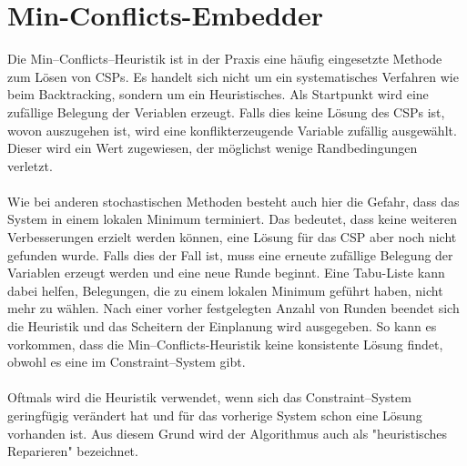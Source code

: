 \section{Min-Conflicts-Embedder}\label{minConflicts}
Die Min--Conflicts--Heuristik ist in der Praxis eine häufig eingesetzte Methode zum Lösen von CSPs. Es handelt sich nicht um ein systematisches Verfahren wie beim Backtracking, sondern um ein Heuristisches. Als Startpunkt wird eine zufällige Belegung der Veriablen erzeugt. Falls dies keine Lösung des CSPs ist, wovon auszugehen ist, wird eine kon\-flikt\-er\-zeu\-gen\-de Variable zufällig ausgewählt. Dieser wird ein Wert zugewiesen, der möglichst wenige Randbedingungen verletzt.\\ \\
Wie bei anderen stochastischen Methoden besteht auch hier die Gefahr, dass das System in einem lokalen Minimum terminiert. Das bedeutet, dass keine weiteren Verbesserungen
erzielt werden können, eine Lösung für das CSP aber noch nicht gefunden
wurde. Falls dies der Fall ist, muss eine erneute zufällige Belegung der Variablen erzeugt werden und eine neue Runde beginnt. Eine Tabu-Liste kann dabei helfen, Belegungen, die zu einem lokalen Minimum geführt haben, nicht mehr zu wählen. Nach einer vorher festgelegten Anzahl von Runden beendet sich die Heuristik und das Scheitern der Einplanung wird ausgegeben. So kann es vorkommen, dass die Min--Conflicts-Heuristik keine konsistente Lösung findet, obwohl es eine im Constraint--System gibt.\\ \\
Oftmals wird die Heuristik verwendet, wenn sich das Constraint--System geringfügig verändert hat und für das vorherige System schon eine Lösung vorhanden ist. Aus diesem Grund wird der Algorithmus auch als "heuristisches Reparieren" \cite{cspsolvingRepairMethod} bezeichnet.\\ \\
